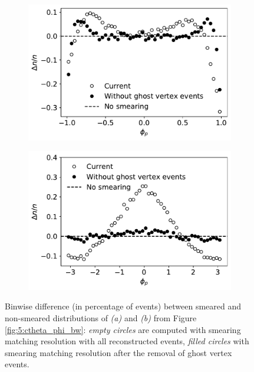 \begin{figure}[t]
	\centering
	\begin{subfigure}{.45\textwidth}
		\includegraphics[width=\textwidth]{graphics/05-angular_distributions/ctheta_bw_residuals.pdf}
		\caption{}
		\label{fig:5:ctheta_bw_residuals}
	\end{subfigure}
	\begin{subfigure}{.45\textwidth}
		\includegraphics[width=\textwidth]{graphics/05-angular_distributions/phi_residuals.pdf}
		\caption{}
		\label{fig:5:phi_bw_residuals}
	\end{subfigure}
	\caption{Binwise difference (in percentage of events) between smeared and non-smeared distributions of \cthetap \textit{(a)} and \phip \textit{(b)} from Figure \ref{fig:5:ctheta_phi_bw}: \textit{empty circles} are computed with smearing matching resolution with all reconstructed \demonstratorshort events, \textit{filled circles} with smearing matching resolution after the removal of ghost vertex events.}
	\label{fig:5:bw_residuals}
\end{figure}

